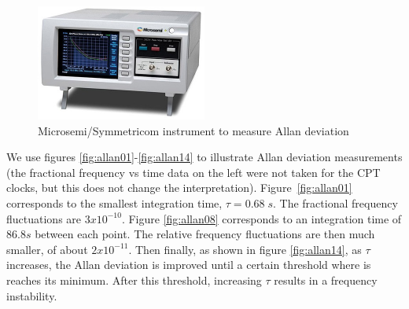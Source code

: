 \documentclass[a4paper,12pt]{article}
\begin{document}
\begin{figure}[!h]
    \centering
    \includegraphics[width=0.5\textwidth]{Images/5125A.jpg}
    \captionsetup{justification=centering}
    \caption{Microsemi\slash Symmetricom instrument to measure Allan deviation} 
    \label{fig:5125A}
\end{figure}

We use figures \ref{fig:allan01}-\ref{fig:allan14} to illustrate Allan deviation measurements (the fractional frequency vs time data on the left were not taken for the CPT clocks, but this does not change the interpretation). \mbox{Figure \ref{fig:allan01}} corresponds to the smallest integration time, $\tau = 0.68\; s$. The fractional frequency fluctuations are $3x10^{-10}$. Figure \ref{fig:allan08} corresponds to an integration time of $86.8 s$ between each point. The relative frequency fluctuations are then much smaller, of about $2x10^{-11}$. Then finally, as shown in figure \ref{fig:allan14}, as $\tau$ increases, the Allan deviation is improved until a certain threshold where is reaches its minimum. After this threshold, increasing $\tau$ results in a frequency instability.
\end{document}
